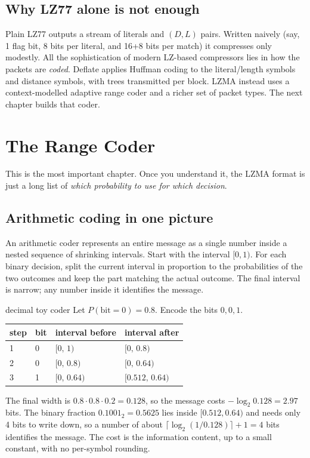 \documentclass[11pt,a4paper,oneside]{book}
\begin{document}
\section{Why LZ77 alone is not enough}

Plain LZ77 outputs a stream of literals and $(D,L)$ pairs. Written naively (say, 1 flag bit, 8 bits per literal,
and 16+8 bits per match) it compresses only modestly. All the sophistication of modern LZ-based compressors lies in how the
packets are \emph{coded}. Deflate applies Huffman coding to the literal/length symbols and distance symbols, with trees
transmitted per block. LZMA instead uses a context-modelled adaptive range coder and a richer set of packet types. The next
chapter builds that coder.

\chapter{The Range Coder}

This is the most important chapter. Once you understand it, the LZMA format is just a long list of
\emph{which probability to use for which decision}.

\section{Arithmetic coding in one picture}

An arithmetic coder represents an entire message as a single number inside a nested sequence of shrinking intervals.
Start with the interval $[0,1)$. For each binary decision, split the current interval in proportion to the probabilities of
the two outcomes and keep the part matching the actual outcome. The final interval is narrow; any number inside it identifies the message.

\begin{workedex}{decimal toy coder}
Let $P(\text{bit}=0)=0.8$. Encode the bits $0,0,1$.
\begin{center}
\begin{tabular}{llll}
\toprule
step & bit & interval before & interval after\\
\midrule
1 & 0 & $[0,\,1)$ & $[0,\,0.8)$\\
2 & 0 & $[0,\,0.8)$ & $[0,\,0.64)$\\
3 & 1 & $[0,\,0.64)$ & $[0.512,\,0.64)$\\
\bottomrule
\end{tabular}
\end{center}
The final width is $0.8\cdot0.8\cdot0.2=0.128$, so the message costs $-\log_2 0.128=2.97$ bits. The binary fraction
$0.1001_2=0.5625$ lies inside $[0.512,0.64)$ and needs only 4 bits to write down, so a number of about
$\lceil\log_2(1/0.128)\rceil+1=4$ bits identifies the message. The cost is the information content, up to a small constant, with no
per-symbol rounding.
\end{workedex}
\end{document}
